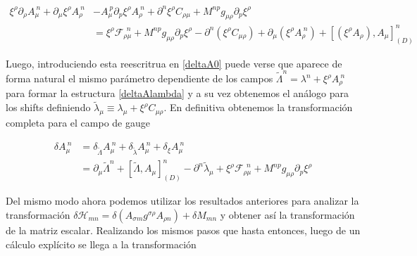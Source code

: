\documentclass{article}
\numberwithin{equation}{section}
\begin{document}
\begin{equation}
\begin{aligned}
\xi^{\rho} \partial_{\rho} A_{\mu}^{\ n} +  \partial_{\mu} \xi^{\rho} A_{\rho}^{\ n} &- A_{\mu}^{\ p} \partial_p \xi^{\rho} A_{\rho}^{\ n} +  \partial^n \xi^{\rho} C_{\rho \mu} + M^{n p} g_{\mu \rho} \partial_p \xi^{\rho}\\
&= \xi^{\rho} \mathcal{F}_{\rho \mu}^{\ \ n} + M^{n p} g_{\mu \rho} \partial_p \xi^{\rho}  - \partial^n \left(\xi^{\rho} C_{\mu \rho}\right) +  \partial_{\mu} \left(\xi^{\rho} A_{\rho}^{\ n} \right) + \left[ \left(\xi^{\rho} A_{\rho} \right), A_{\mu}\right]_{(D)}^n
\end{aligned}
\end{equation}

Luego, introduciendo esta reescritrua en \ref{deltaA0} puede verse que aparece de forma natural el mismo parámetro dependiente de los campos $ \widetilde{\Lambda}^n = \lambda^n +  \xi^{\rho} A_{\rho}^{\ n} $ para formar la estructura \ref{deltaAlambda} y a su vez obtenemos el análogo para los shifts definiendo $ \widetilde{\lambda}_{\mu} \equiv \lambda_{\mu} + \xi^{\rho} C_{\mu \rho} $. En definitiva obtenemos la transformación completa para el campo de gauge

\begin{boxquation}
\begin{equation}
\begin{aligned}
\delta A_{\mu}^{\ n} &= \delta_{\widetilde{\Lambda}} A_{\mu}^{\ n} + \delta_{\widetilde{\lambda}} A_{\mu}^{\ n} + \delta_{\xi} A_{\mu}^{\ n}\\
&=\partial_{\mu} \widetilde{\Lambda}^n + \left[ \widetilde{\Lambda}, A_{\mu}\right]_{(D)}^n - \partial^n \widetilde{\lambda}_{\mu} + \xi^{\rho} \mathcal{F}_{\rho \mu}^{\ \ n} + M^{n p} g_{\mu \rho} \partial_p \xi^{\rho} 
\end{aligned}
\end{equation}
\end{boxquation}

\vspace{.5cm}

Del mismo modo ahora podemos utilizar los resultados anteriores para analizar la transformación $ \delta \mathcal{H}_{m n}= \delta \left( A_{\sigma m }g^{\sigma \rho} A_{\rho n} \right) + \delta M_{m n}$ y obtener así la transformación de la matriz escalar. Realizando los mismos pasos que hasta entonces, luego de un cálculo explícito se llega a la transformación
\end{document}
